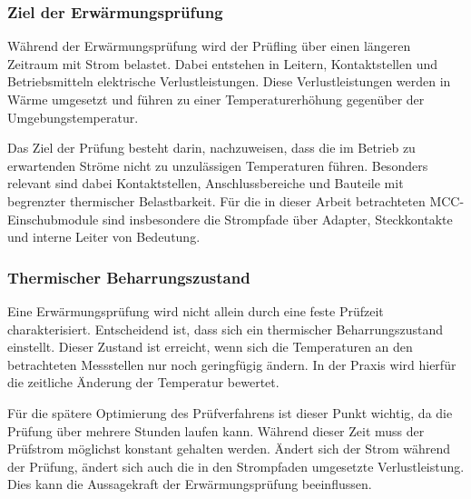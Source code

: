 \subsubsection{Ziel der Erwärmungsprüfung}
\label{sec:ziel_erwaermungspruefung}

Während der Erwärmungsprüfung wird der Prüfling über einen längeren Zeitraum mit Strom belastet. Dabei entstehen in Leitern, Kontaktstellen und Betriebsmitteln elektrische Verlustleistungen. Diese Verlustleistungen werden in Wärme umgesetzt und führen zu einer Temperaturerhöhung gegenüber der Umgebungstemperatur.

Das Ziel der Prüfung besteht darin, nachzuweisen, dass die im Betrieb zu erwartenden Ströme nicht zu unzulässigen Temperaturen führen. Besonders relevant sind dabei Kontaktstellen, Anschlussbereiche und Bauteile mit begrenzter thermischer Belastbarkeit. Für die in dieser Arbeit betrachteten MCC-Einschubmodule sind insbesondere die Strompfade über Adapter, Steckkontakte und interne Leiter von Bedeutung.

\subsubsection{Thermischer Beharrungszustand}
\label{sec:thermischer_beharrungszustand}

Eine Erwärmungsprüfung wird nicht allein durch eine feste Prüfzeit charakterisiert. Entscheidend ist, dass sich ein thermischer Beharrungszustand einstellt. Dieser Zustand ist erreicht, wenn sich die Temperaturen an den betrachteten Messstellen nur noch geringfügig ändern. In der Praxis wird hierfür die zeitliche Änderung der Temperatur bewertet.

Für die spätere Optimierung des Prüfverfahrens ist dieser Punkt wichtig, da die Prüfung über mehrere Stunden laufen kann. Während dieser Zeit muss der Prüfstrom möglichst konstant gehalten werden. Ändert sich der Strom während der Prüfung, ändert sich auch die in den Strompfaden umgesetzte Verlustleistung. Dies kann die Aussagekraft der Erwärmungsprüfung beeinflussen.

